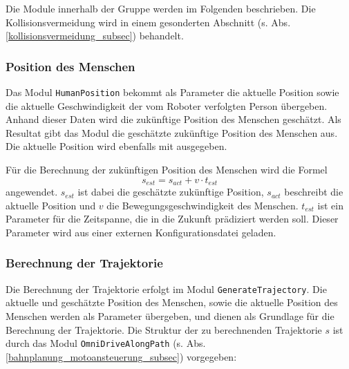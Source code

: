 Die Module innerhalb der Gruppe werden im Folgenden beschrieben.
Die Kollisionsvermeidung wird in einem gesonderten Abschnitt (s. Abs. \ref{kollisionsvermeidung_subsec}) behandelt.


\subsubsection{Position des Menschen}
\label{bahnplanung_humanPosition_subsubsec}


Das Modul \lstinline{HumanPosition} bekommt als Parameter die aktuelle Position sowie die aktuelle Geschwindigkeit der vom Roboter verfolgten Person übergeben.
Anhand dieser Daten wird die zukünftige Position des Menschen geschätzt.
Als Resultat gibt das Modul die geschätzte zukünftige Position des Menschen aus.
Die aktuelle Position wird ebenfalls mit ausgegeben.

Für die Berechnung der zukünftigen Position des Menschen wird die Formel
\begin{equation}
	s_{est} = s_{act} + v \cdot t_{est}
\end{equation}
angewendet.
$s_{est}$ ist dabei die geschätzte zukünftige Position, $s_{act}$ beschreibt die aktuelle Position und $v$ die Bewegungsgeschwindigkeit des Menschen.
$t_{est}$ ist ein Parameter für die Zeitspanne, die in die Zukunft prädiziert werden soll.
Dieser Parameter wird aus einer externen Konfigurationsdatei geladen.


\subsubsection{Berechnung der Trajektorie}
\label{bahnplanung_trajektorie_subsubsec}

Die Berechnung der Trajektorie erfolgt im Modul \lstinline{GenerateTrajectory}.
Die aktuelle und geschätzte Position des Menschen, sowie die aktuelle Position des Menschen werden als Parameter übergeben, und dienen als Grundlage für die Berechnung der Trajektorie.
Die Struktur der zu berechnenden Trajektorie $s$ ist durch das Modul \lstinline{OmniDriveAlongPath} (s. Abs. \ref{bahnplanung_motoansteuerung_subsec}) vorgegeben:

